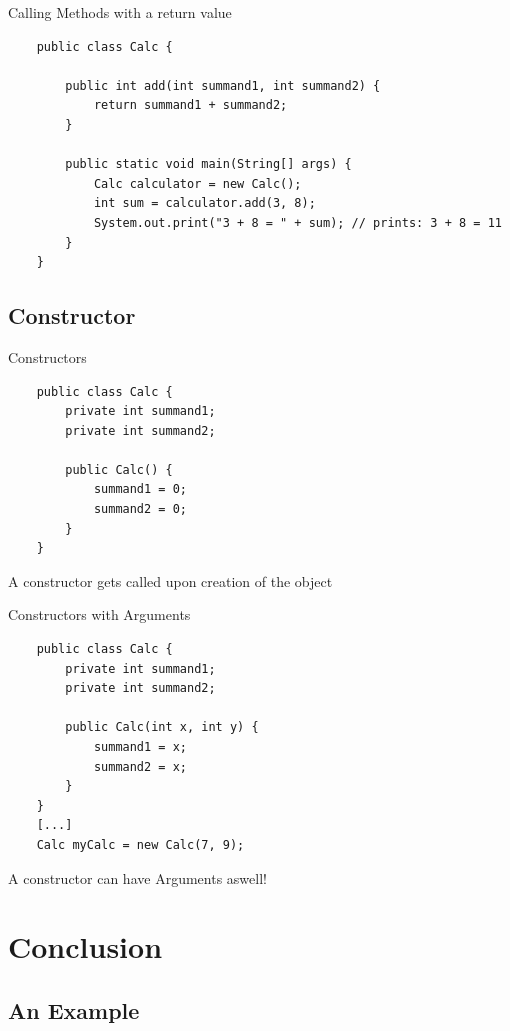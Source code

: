 \begin{frame}[fragile]{Calling Methods with a return value}
	\begin{lstlisting}
	public class Calc {
	
	    public int add(int summand1, int summand2) {
	        return summand1 + summand2;
	    }
	    
	    public static void main(String[] args) {
	        Calc calculator = new Calc();
	        int sum = calculator.add(3, 8);
	        System.out.print("3 + 8 = " + sum); // prints: 3 + 8 = 11
	    }
	}
	\end{lstlisting}
\end{frame}

\subsection{Constructor}

\begin{frame}[fragile]{Constructors}
	\begin{lstlisting}
	public class Calc {
		private int summand1;
		private int summand2;
	
	    public Calc() {
			summand1 = 0;
			summand2 = 0;
	    }
	}
	\end{lstlisting}
	A constructor gets called upon creation of the object
\end{frame}

\begin{frame}[fragile]{Constructors with Arguments}
	\begin{lstlisting}
	public class Calc {
		private int summand1;
		private int summand2;
	
	    public Calc(int x, int y) {
			summand1 = x;
			summand2 = x;
	    }
	}
	[...]
	Calc myCalc = new Calc(7, 9);
	\end{lstlisting}
	A constructor can have Arguments aswell!
\end{frame}

\section{Conclusion}
\subsection{An Example}

